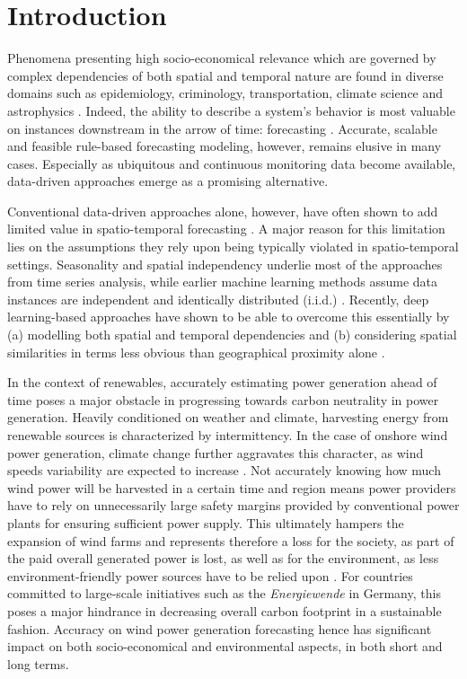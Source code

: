 \chapter{Introduction}
Phenomena presenting high socio-economical relevance which are governed by complex dependencies of both spatial and temporal nature are found in diverse domains such as epidemiology, criminology, transportation, climate science and astrophysics \cite{atluri2018survey}.
Indeed, the ability to describe a system's behavior is most valuable on instances downstream in the arrow of time: forecasting \cite{armstrong2001principles, gartner2017analytics}.
Accurate, scalable and feasible rule-based forecasting modeling, however, remains elusive in many cases.
Especially as ubiquitous and continuous monitoring data become available, data-driven approaches emerge as a promising alternative.

Conventional data-driven approaches alone, however, have often shown to add limited value in spatio-temporal forecasting \cite{makridakis2018statistical}.
A major reason for this limitation lies on the assumptions they rely upon being typically violated in spatio-temporal settings.
Seasonality and spatial independency underlie most of the approaches from time series analysis, while earlier machine learning methods assume data instances are independent and identically distributed (i.i.d.) \cite{atluri2018survey}.
Recently, deep learning-based approaches have shown to be able to overcome this essentially by (a) modelling both spatial and temporal dependencies and (b) considering spatial similarities in terms less obvious than geographical proximity alone \cite{liu2017dcrnn, yao2018deep, li2019stgcn, zhang2019graphwavenet}.

In the context of renewables, accurately estimating power generation ahead of time poses a major obstacle in progressing towards carbon neutrality in power generation.
Heavily conditioned on weather and climate, harvesting energy from renewable sources is characterized by intermittency.
In the case of onshore wind power generation, climate change further aggravates this character, as wind speeds variability are expected to increase \cite{moemken2018future}.
Not accurately knowing how much wind power will be harvested in a certain time and region means power providers have to rely on unnecessarily large safety margins provided by conventional power plants for ensuring sufficient power supply.  
This ultimately hampers the expansion of wind farms and represents therefore a loss for the society, as part of the paid overall generated power is lost, as well as for the environment, as less environment-friendly power sources have to be relied upon \cite{delarue2015intermittency}.
For countries committed to large-scale initiatives such as the \textit{Energiewende} in Germany, this poses a major hindrance in decreasing overall carbon footprint in a sustainable fashion.
Accuracy on wind power generation forecasting hence has significant impact on both socio-economical and environmental aspects, in both short and long terms.

